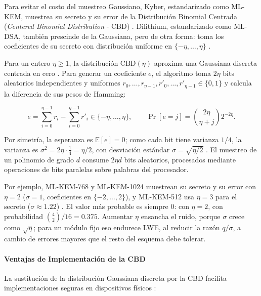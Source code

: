 Para evitar el costo del muestreo Gaussiano, Kyber, estandarizado como ML-KEM, muestrea su secreto y su error de la Distribución Binomial Centrada (\textit{Centered Binomial Distribution} - CBD) \cite{yang2025multiserver, mukil2026implementing, nist2024fips203}. Dilithium, estandarizado como ML-DSA, también prescinde de la Gaussiana, pero de otra forma: toma los coeficientes de su secreto con distribución uniforme en $\{-\eta, \dots, \eta\}$ \cite{bai2021dilithium, nist2024fips204}.

Para un entero $\eta \ge 1$, la distribución $\mathrm{CBD}(\eta)$ aproxima una Gaussiana discreta centrada en cero \cite{yang2025multiserver}. Para generar un coeficiente $e$, el algoritmo toma $2\eta$ bits aleatorios independientes y uniformes $r_0, \dots, r_{\eta-1}, r'_0, \dots, r'_{\eta-1} \in \{0, 1\}$ y calcula la diferencia de sus pesos de Hamming:

\begin{equation}
e = \sum_{i=0}^{\eta-1} r_i - \sum_{i=0}^{\eta-1} r'_i \in \{-\eta, \dots, \eta\}, \qquad \Pr[e = j] = \binom{2\eta}{\eta + j} 2^{-2\eta}.
\end{equation}

Por simetría, la esperanza es $\mathbb{E}[e] = 0$; como cada bit tiene varianza $1/4$, la varianza es $\sigma^2 = 2\eta \cdot \tfrac{1}{4} = \eta / 2$, con desviación estándar $\sigma = \sqrt{\eta/2}$ \cite{yang2025multiserver}. El muestreo de un polinomio de grado $d$ consume $2\eta d$ bits aleatorios, procesados mediante operaciones de bits paralelas sobre palabras del procesador.

Por ejemplo, ML-KEM-768 y ML-KEM-1024 muestrean su secreto y su error con $\eta = 2$ ($\sigma = 1$, coeficientes en $\{-2, \dots, 2\}$), y ML-KEM-512 usa $\eta = 3$ para el secreto ($\sigma \approx 1.22$) \cite{nist2024fips203}. El valor más probable es siempre $0$: con $\eta = 2$, con probabilidad $\binom{4}{2}/16 = 0.375$. Aumentar $\eta$ ensancha el ruido, porque $\sigma$ crece como $\sqrt{\eta}$; para un módulo fijo eso endurece LWE, al reducir la razón $q/\sigma$, a cambio de errores mayores que el resto del esquema debe tolerar.

\paragraph{Ventajas de Implementación de la CBD}

La sustitución de la distribución Gaussiana discreta por la CBD facilita implementaciones seguras en dispositivos físicos \cite{yang2025multiserver, mukil2026implementing}:

